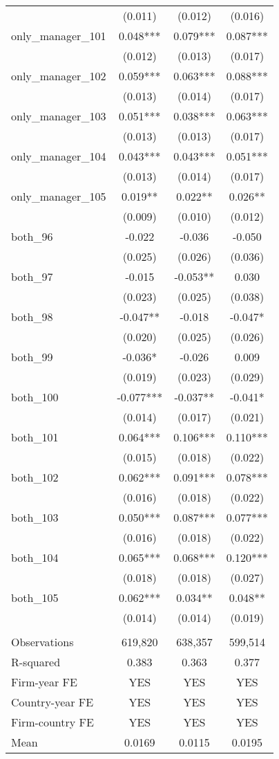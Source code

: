 \begin{tabular}{lccc}
 & (0.011) & (0.012) & (0.016) \\
only\_manager\_101 & 0.048*** & 0.079*** & 0.087*** \\
 & (0.012) & (0.013) & (0.017) \\
only\_manager\_102 & 0.059*** & 0.063*** & 0.088*** \\
 & (0.013) & (0.014) & (0.017) \\
only\_manager\_103 & 0.051*** & 0.038*** & 0.063*** \\
 & (0.013) & (0.013) & (0.017) \\
only\_manager\_104 & 0.043*** & 0.043*** & 0.051*** \\
 & (0.013) & (0.014) & (0.017) \\
only\_manager\_105 & 0.019** & 0.022** & 0.026** \\
 & (0.009) & (0.010) & (0.012) \\
both\_96 & -0.022 & -0.036 & -0.050 \\
 & (0.025) & (0.026) & (0.036) \\
both\_97 & -0.015 & -0.053** & 0.030 \\
 & (0.023) & (0.025) & (0.038) \\
both\_98 & -0.047** & -0.018 & -0.047* \\
 & (0.020) & (0.025) & (0.026) \\
both\_99 & -0.036* & -0.026 & 0.009 \\
 & (0.019) & (0.023) & (0.029) \\
both\_100 & -0.077*** & -0.037** & -0.041* \\
 & (0.014) & (0.017) & (0.021) \\
both\_101 & 0.064*** & 0.106*** & 0.110*** \\
 & (0.015) & (0.018) & (0.022) \\
both\_102 & 0.062*** & 0.091*** & 0.078*** \\
 & (0.016) & (0.018) & (0.022) \\
both\_103 & 0.050*** & 0.087*** & 0.077*** \\
 & (0.016) & (0.018) & (0.022) \\
both\_104 & 0.065*** & 0.068*** & 0.120*** \\
 & (0.018) & (0.018) & (0.027) \\
both\_105 & 0.062*** & 0.034** & 0.048** \\
 & (0.014) & (0.014) & (0.019) \\
 &  &  &  \\
Observations & 619,820 & 638,357 & 599,514 \\
R-squared & 0.383 & 0.363 & 0.377 \\
Firm-year FE & YES & YES & YES \\
Country-year FE & YES & YES & YES \\
Firm-country FE & YES & YES & YES \\
 Mean & 0.0169 & 0.0115 & 0.0195 \\ \hline
\end{tabular}
